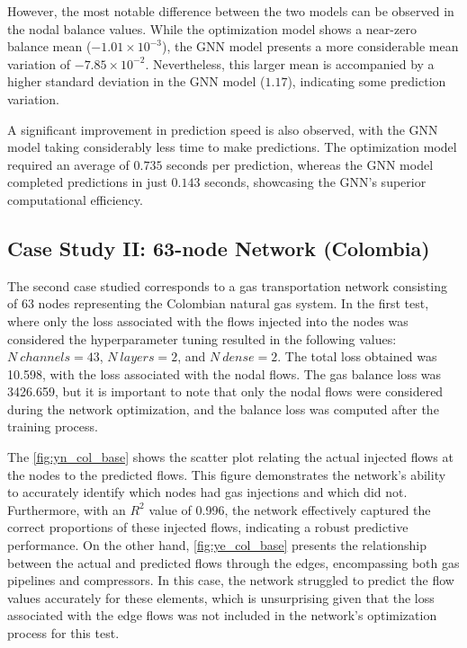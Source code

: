 However, the most notable difference between the two models can be observed in the nodal balance values. While the optimization model shows a near-zero balance mean ($-1.01 \times 10^{-3}$), the GNN model presents a more considerable mean variation of $-7.85 \times 10^{-2}$. Nevertheless, this larger mean is accompanied by a higher standard deviation in the GNN model ($1.17$), indicating some prediction variation. 

A significant improvement in prediction speed is also observed, with the GNN model taking considerably less time to make predictions. The optimization model required an average of $0.735$ seconds per prediction, whereas the GNN model completed predictions in just $0.143$ seconds, showcasing the GNN's superior computational efficiency.






\subsection{Case Study II: 63-node Network (Colombia)}


The second case studied corresponds to a gas transportation network consisting of 63 nodes representing the Colombian natural gas system. In the first test, where only the loss associated with the flows injected into the nodes was considered the hyperparameter tuning resulted in the following values: $N \ channels = 43$, $N \ layers = 2$, and $N \ dense = 2$. The total loss obtained was 10.598, with the loss associated with the nodal flows. The gas balance loss was 3426.659, but it is important to note that only the nodal flows were considered during the network optimization, and the balance loss was computed after the training process.

The \cref{fig:yn_col_base} shows the scatter plot relating the actual injected flows at the nodes to the predicted flows. This figure demonstrates the network's ability to accurately identify which nodes had gas injections and which did not. Furthermore, with an $R^2$ value of 0.996, the network effectively captured the correct proportions of these injected flows, indicating a robust predictive performance. 
On the other hand, \cref{fig:ye_col_base} presents the relationship between the actual and predicted flows through the edges, encompassing both gas pipelines and compressors. In this case, the network struggled to predict the flow values accurately for these elements, which is unsurprising given that the loss associated with the edge flows was not included in the network's optimization process for this test.

